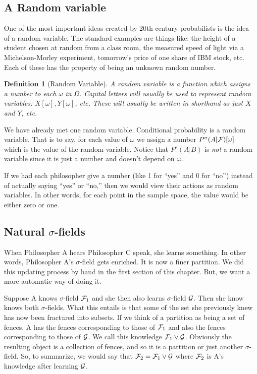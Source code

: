 \documentclass[14pt]{extarticle}
\newtheorem{definition}{Definition}
\newcounter{chapter}
\begin{document}
        \subsection{A Random variable}
%

One of the most important ideas created by  20th century probabilists
is the idea of a random variable.  The standard examples are things
like: the height of a student chosen at random from a class room, the
measured speed of light via a Michelson-Morley experiment, tomorrow's
price of one share of IBM stock, etc.  Each of these has the property
of being an unknown random number.

\begin{definition}[Random Variable] \label{def:random_variable} A
  random variable is a function which assigns a number to each
  $\omega$ in $\Omega$.  Capital letters will usually be used to
  represent random variables: $X[\omega], Y[\omega]$, etc.  These
  will usually be written in shorthand as just $X$ and $Y$, etc.
\end{definition}

We have already met one random variable.  Conditional probability is a
random variable.  That is to say, for each value of $\omega$ we assign
a number $P^\sigma(A|{\cal F})[\omega]$ which is the value of the
random variable.  Notice that $P^s(A|B)$ is {\em not} a random
variable since it is just a number and doesn't depend on $\omega$.

If we had each philosopher give a number (like 1 for ``yes'' and 0 for
``no'') instead of actually saying ``yes'' or ``no,'' then we would
view their actions as random variables.  In other words, for each
point in the sample space, the value would be either zero or one.
 
        \subsection{Natural $\sigma$-fields}

When Philosopher A hears Philosopher C speak, she learns something.
In other words, Philosopher A's $\sigma$-field gets enriched.  It is
now a finer partition.  We did this updating process by hand in the
first section of this chapter.  But, we want a more automatic way of
doing it.  

Suppose A knows $\sigma$-field ${\cal F}_1$ and she then also learns
$\sigma$-field ${\cal G}$.  Then she know knows both
$\sigma$-fields.  What this entails is that some of the set she
previously knew has now been fractured into subsets.  If we think of
a partition as being a set of fences, A has the fences corresponding
to those of ${\cal F}_1$ and also the fences corresponding to those of ${\cal
  G}$.  We call this knowledge ${\cal F}_1 \vee {\cal G}$.  Obviously
the resulting object is a collection of fences, and so it is a
partition or just another $\sigma$-field.  So, to summarize, we
would say that ${\cal F}_2 = {\cal F}_1 \vee {\cal G}$ where ${\cal
  F}_2$ is A's knowledge after learning ${\cal G}$. 
\end{document}
